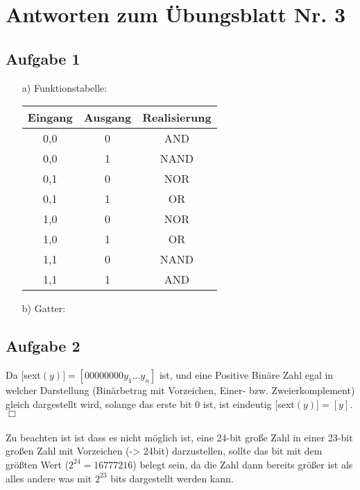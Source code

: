 \documentclass{scrartcl}
\begin{document}
	\section*{Antworten zum Übungsblatt Nr. 3}

	\subsection*{Aufgabe 1}
	\begin{itemize}
	\item[a)] Funktionstabelle:

		\begin{table}[h]

			\begin{tabular}{c|c|c}
				Eingang & Ausgang & Realisierung \\
				\hline
				0,0 & 0 & AND \\
				0,0 & 1 & NAND \\
				0,1 & 0 & NOR \\
				0,1 & 1 & OR \\
				1,0 & 0 & NOR \\
				1,0 & 1 & OR \\
				1,1 & 0 & NAND \\
				1,1 & 1 & AND \\


			\end{tabular}
		\end{table}

	\item[b)] Gatter:



	\end{itemize}
	\subsection*{Aufgabe 2}
	Da [sext\((y)] = [00000000y_1...y_n] \) ist, und eine Positive Binäre Zahl egal in welcher
	Darstellung (Binärbetrag mit Vorzeichen, Einer- bzw. Zweierkomplement) gleich dargestellt
	wird, solange das erste bit 0 ist, ist eindeutig [sext\((y)] = [y] \). \hfill $\Box$
        \\ \\

        Zu beachten ist ist dass es nicht möglich ist, eine 24-bit große Zahl in einer 23-bit
        großen Zahl mit Vorzeichen (-> 24bit) darzustellen, sollte das bit mit dem größten Wert
        ($2^{24} = 16777216$) belegt sein, da die Zahl dann bereits größer ist als alles andere
        was mit $2^{23}$ bits dargestellt werden kann.
\end{document}
